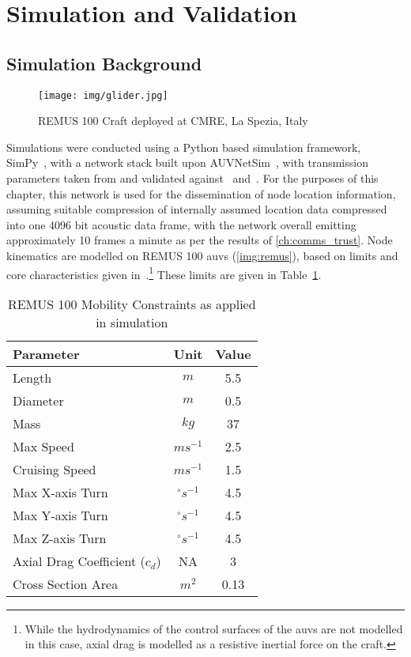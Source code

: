 \section{Simulation and Validation}\label{sec:sim_and_valid}

\subsection{Simulation Background}

\begin{figure}
	\centering
	\texttt{[image: img/glider.jpg]}
	\caption{REMUS 100 Craft deployed at CMRE, La Spezia, Italy}
	\label{img:remus}
\end{figure}

Simulations were conducted using a Python based simulation framework, SimPy~\cite{Mueller2003SimPy}, with a network stack built upon AUVNetSim~\cite{Miquel2008}, with transmission parameters taken from and validated against~\cite{Stojanovic2007} and~\cite{Stefanov2011}.
For the purposes of this chapter, this network is used for the dissemination of node location information, assuming suitable compression of internally assumed location data compressed into one 4096 bit acoustic data frame, with the network overall emitting approximately 10 frames a minute as per the results of \autoref{ch:comms_trust}.
Node kinematics are modelled on REMUS 100 \glspl{auv} (\autoref{img:remus}), based on limits and core characteristics given in~\cite{Mcewen2001,Milgram2001,Samad2011}.\footnote{While the hydrodynamics of the control surfaces of the \glspl{auv} are not modelled in this case, axial drag is modelled as a resistive inertial force on the craft.}
These limits are given in Table~\ref{tab:mobility_sysconstraints}.

\begin{table}
  \caption{REMUS 100 Mobility Constraints as applied in simulation} \label{tab:mobility_sysconstraints}
  \begin{center}
    \setlength{\tabcolsep}{8pt}
    \begin{tabular}{lcc}
      \toprule
      Parameter & Unit & Value \\
      \midrule
      Length & $m$ & 5.5\\
      Diameter & $m$ & 0.5\\
      Mass & $kg$ & 37 \\ 
      Max Speed & $ms^{-1}$ & 2.5\\
      Cruising Speed & $ms^{-1}$ & 1.5\\
      Max X-axis Turn & $^{\circ} s^{-1}$ & 4.5\\
      Max Y-axis Turn & $^{\circ} s^{-1}$ & 4.5\\
      Max Z-axis Turn & $^{\circ} s^{-1}$ & 4.5\\
      Axial Drag Coefficient ($c_d$) & NA & 3\\
      Cross Section Area & $m^2$ & 0.13\\
      \bottomrule
    \end{tabular}
    \setlength{\tabcolsep}{6pt}
  \end{center}
\end{table}

